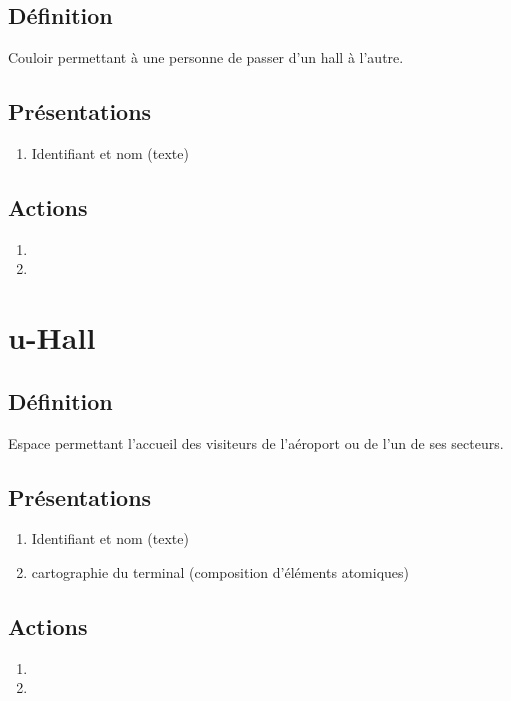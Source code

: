 \subsection{Définition}
	Couloir permettant à une personne de passer d'un hall à l'autre.

\subsection{Présentations}
\begin{enumerate}
	\item Identifiant et nom (texte)
\end{enumerate}

\subsection{Actions}
\begin{enumerate}
	\item {}
	\item {}
\end{enumerate}

\section{u-Hall}
\subsection{Définition}
	Espace permettant l'accueil des visiteurs de l'aéroport ou de l'un de ses secteurs.
\subsection{Présentations}
\begin{enumerate}
	\item Identifiant et nom (texte)
	\item cartographie du terminal (composition d'éléments atomiques)
\end{enumerate}

\subsection{Actions}
\begin{enumerate}
	\item {}
	\item {}
\end{enumerate}

